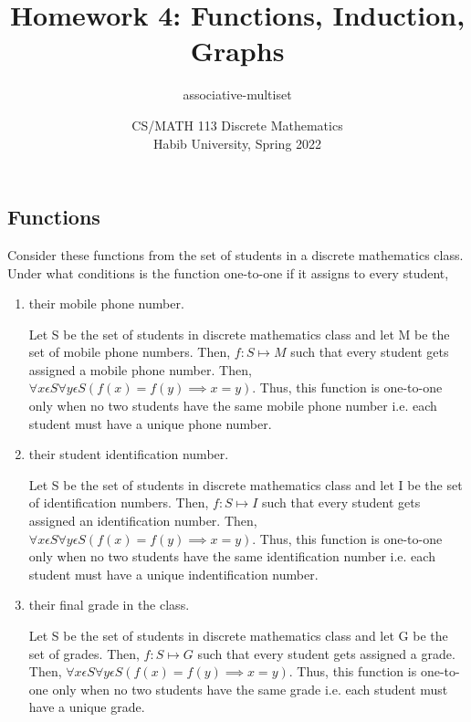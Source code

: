 \documentclass[addpoints]{exam}
\title{Homework 4: Functions, Induction, Graphs}
\author{associative-multiset}  %
\date{CS/MATH 113 Discrete Mathematics\\Habib University, Spring 2022}
\begin{document}
\maketitle

\begin{questions}

  \section*{Functions}
  
\question[5] Consider these functions from the set of students in a discrete mathematics class. Under what conditions is the
  function one-to-one if it assigns to every student,
  
  \begin{enumerate}[label=\alph*)]
  \item their mobile phone number.
    \begin{solution}
      Let S be the set of students in discrete mathematics class and let M be the set of mobile phone numbers. Then, $f: S \mapsto M$ such that every student gets assigned a mobile phone number. 
      Then, $\forall x \epsilon S \forall y \epsilon S (f(x) = f(y) \implies x = y) $. Thus, this function is one-to-one only when no two students have the same mobile phone number i.e. each student must have a unique phone number.
    \end{solution}
  \item their student identification number.
    \begin{solution}
      Let S be the set of students in discrete mathematics class and let I be the set of identification numbers. Then, $f: S \mapsto I$ such that every student gets assigned an identification number. 
      Then, $\forall x \epsilon S \forall y \epsilon S (f(x) = f(y) \implies x = y) $. Thus, this function is one-to-one only when no two students have the same identification number i.e. each student must have a unique indentification number.
    \end{solution}
  \item their final grade in the class.
    \begin{solution}
      Let S be the set of students in discrete mathematics class and let G be the set of grades. Then, $f: S \mapsto G$ such that every student gets assigned a grade. 
      Then, $\forall x \epsilon S \forall y \epsilon S (f(x) = f(y) \implies x = y) $. Thus, this function is one-to-one only when no two students have the same grade i.e. each student must have a unique grade.

\end{solution}
\end{enumerate}
\end{questions}
\end{document}
